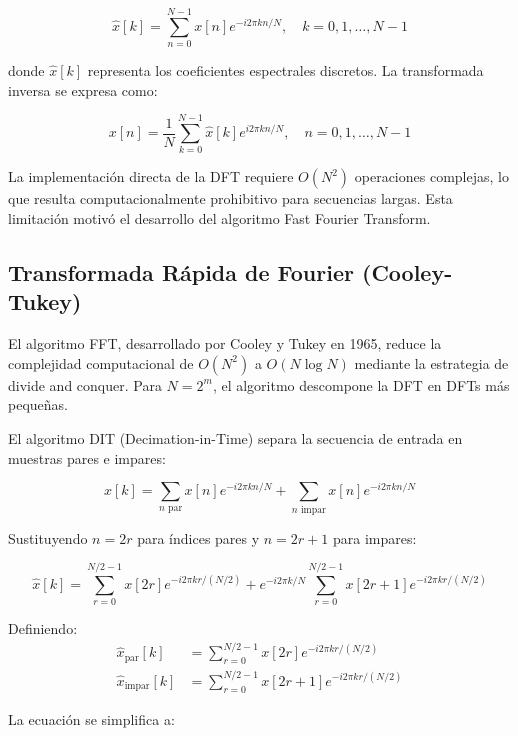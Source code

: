 \documentclass[a4paper]{article}
\begin{document}
\begin{equation}
    \hat{x}[k] = \sum_{n=0}^{N-1} x[n] e^{-i2\pi kn/N}, \quad k = 0, 1, \ldots, N-1
\end{equation}

donde $\hat{x}[k]$ representa los coeficientes espectrales discretos. La transformada inversa se expresa como:

\begin{equation}
    x[n] = \frac{1}{N} \sum_{k=0}^{N-1} \hat{x}[k] e^{i2\pi kn/N}, \quad n = 0, 1, \ldots, N-1
\end{equation}

La implementación directa de la DFT requiere $O(N^2)$ operaciones complejas, lo que resulta computacionalmente prohibitivo para
secuencias largas. Esta limitación motivó el desarrollo del algoritmo Fast Fourier Transform.

\subsection{Transformada Rápida de Fourier (Cooley-Tukey)}

El algoritmo FFT, desarrollado por Cooley y Tukey en 1965, reduce la complejidad computacional de $O(N^2)$ a $O(N \log N)$
mediante la estrategia de divide and conquer. Para $N = 2^m$, el algoritmo descompone la DFT en DFTs más pequeñas.

El algoritmo DIT (Decimation-in-Time) separa la secuencia de entrada en muestras pares e impares:

\begin{equation}
    \hat{x}[k] = \sum_{n \text{ par}} x[n] e^{-i2\pi kn/N} + \sum_{n \text{ impar}} x[n] e^{-i2\pi kn/N}
\end{equation}

Sustituyendo $n = 2r$ para índices pares y $n = 2r+1$ para impares:

\begin{equation}
    \hat{x}[k] = \sum_{r=0}^{N/2-1} x[2r] e^{-i2\pi kr/(N/2)} + e^{-i2\pi k/N} \sum_{r=0}^{N/2-1} x[2r+1] e^{-i2\pi kr/(N/2)}
\end{equation}

Definiendo:
\begin{align}
    \hat{x}_{\text{par}}[k]   & = \sum_{r=0}^{N/2-1} x[2r] e^{-i2\pi kr/(N/2)}   \\
    \hat{x}_{\text{impar}}[k] & = \sum_{r=0}^{N/2-1} x[2r+1] e^{-i2\pi kr/(N/2)}
\end{align}

La ecuación se simplifica a:
\end{document}
